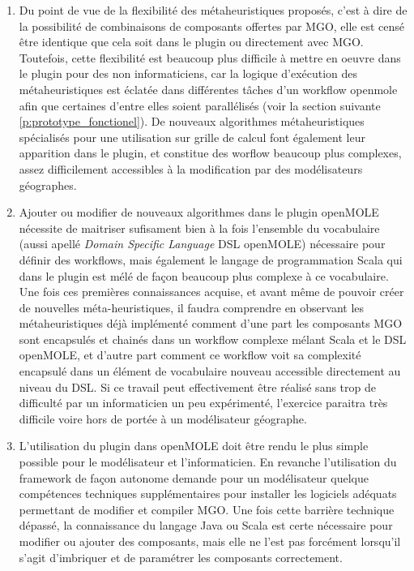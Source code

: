 \begin{enumerate}[label=(\arabic*)]
\item Du point de vue de la flexibilité des métaheuristiques proposés, c'est à dire de la possibilité de combinaisons de composants offertes par MGO, elle est censé être identique que cela soit dans le plugin ou directement avec MGO. Toutefois, cette flexibilité est beaucoup plus difficile à mettre en oeuvre dans le plugin pour des non informaticiens, car la logique d'exécution des métaheuristiques est éclatée dans différentes tâches d'un workflow openmole afin que certaines d'entre elles soient parallélisés (voir la section suivante \ref{p:prototype_fonctionel}). De nouveaux algorithmes métaheuristiques spécialisés pour une utilisation sur grille de calcul font également leur apparition dans le plugin, et constitue des worflow beaucoup plus complexes, assez difficilement accessibles à la modification par des modélisateurs géographes.

\item Ajouter ou modifier de nouveaux algorithmes dans le plugin openMOLE nécessite de maitriser sufisament bien à la fois l'ensemble du vocabulaire (aussi apellé \textit{Domain Specific Language} DSL openMOLE) nécessaire pour définir des workflows, mais également le langage de programmation Scala qui dans le plugin est mélé de façon beaucoup plus complexe à ce vocabulaire. Une fois ces premières connaissances acquise, et avant même de pouvoir créer de nouvelles méta-heuristiques, il faudra comprendre en observant les métaheuristiques déjà implémenté comment d'une part les composants MGO sont encapsulés et chainés dans un workflow complexe mélant Scala et le DSL openMOLE, et d'autre part comment ce workflow voit sa complexité encapsulé dans un élément de vocabulaire nouveau accessible directement au niveau du DSL. Si ce travail peut effectivement être réalisé sans trop de difficulté par un informaticien un peu expérimenté, l'exercice paraitra très difficile voire hors de portée à un modélisateur géographe.

\item L'utilisation du plugin dans openMOLE doit être rendu le plus simple possible pour le modélisateur et l'informaticien. En revanche l'utilisation du framework de façon autonome demande pour un modélisateur quelque compétences techniques supplémentaires pour installer les logiciels adéquats permettant de modifier et compiler MGO. Une fois cette barrière technique dépassé, la connaissance du langage Java ou Scala est certe nécessaire pour modifier ou ajouter des composants, mais elle ne l'est pas forcément lorsqu'il s'agit d'imbriquer et de paramétrer les composants correctement.

\end{enumerate}

